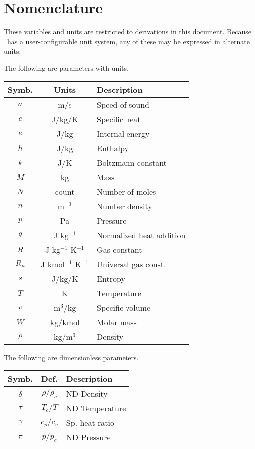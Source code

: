 \section*{Nomenclature}

These variables and units are restricted to derivations in this document.  Because \PM\ has a user-configurable unit system, any of these may be expressed in alternate units.  

The following are parameters with units.

\vspace{1em}
\begin{tabular}{|ccl|}
\hline
Symb. & Units & Description\\
\hline
$a$ & m/s & Speed of sound\\
$c$ & J/kg/K & Specific heat\\
$e$ & J/kg & Internal energy\\
$h$ & J/kg & Enthalpy\\
$k$ & J/K & Boltzmann constant\\
$M$ & kg & Mass\\
$N$ & count & Number of moles\\
$n$ & m$^{-3}$ & Number density\\
$p$ & Pa & Pressure\\
$q$ & J kg$^{-1}$ & Normalized heat addition\\
$R$ & J kg$^{-1}$ K$^{-1}$ & Gas constant\\
$R_u$ & J kmol$^{-1}$ K$^{-1}$ & Universal gas const.\\
$s$ & J/kg/K & Entropy\\
$T$ & K & Temperature\\
$v$ & m$^3$/kg & Specific volume\\
$W$ & kg/kmol & Molar mass\\
$\rho$ & kg/m$^3$ & Density\\
\hline
\end{tabular}
\vspace{1em}

The following are dimensionless parameters.

\vspace{1em}
\begin{tabular}{|ccl|}
\hline
Symb. & Def. & Description\\
\hline
$\delta$ & $\rho/\rho_c$ & ND Density\\
$\tau$ & $T_c / T$ & ND Temperature\\
$\gamma$ & $c_p / c_v$ & Sp. heat ratio\\
$\pi$ & $p / p_c$ & ND Pressure\\
\hline
\end{tabular}
\vspace{1em}

